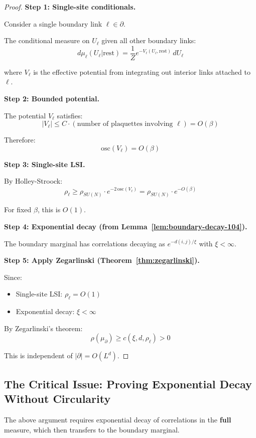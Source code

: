 \begin{proof}
\textbf{Step 1: Single-site conditionals.}

Consider a single boundary link $\ell \in \partial$.

The conditional measure on $U_\ell$ given all other boundary links:
\[
d\mu_\ell(U_\ell | \text{rest}) = \frac{1}{Z} e^{-V_\ell(U_\ell, \text{rest})} \, dU_\ell
\]

where $V_\ell$ is the effective potential from integrating out interior links 
attached to $\ell$.

\textbf{Step 2: Bounded potential.}

The potential $V_\ell$ satisfies:
\[
|V_\ell| \leq C \cdot (\text{number of plaquettes involving } \ell) = O(\beta)
\]

Therefore:
\[
\mathrm{osc}(V_\ell) = O(\beta)
\]

\textbf{Step 3: Single-site LSI.}

By Holley-Stroock:
\[
\rho_\ell \geq \rho_{SU(N)} \cdot e^{-2\,\mathrm{osc}(V_\ell)} = \rho_{SU(N)} \cdot e^{-O(\beta)}
\]

For fixed $\beta$, this is $O(1)$.

\textbf{Step 4: Exponential decay (from Lemma~\ref{lem:boundary-decay-104}).}

The boundary marginal has correlations decaying as $e^{-d(i,j)/\xi}$ with $\xi < \infty$.

\textbf{Step 5: Apply Zegarlinski (Theorem~\ref{thm:zegarlinski}).}

Since:
\begin{itemize}
\item Single-site LSI: $\rho_\ell = O(1)$
\item Exponential decay: $\xi < \infty$
\end{itemize}

By Zegarlinski's theorem:
\[
\rho(\mu_\partial) \geq c(\xi, d, \rho_\ell) > 0
\]

This is independent of $|\partial| = O(L^d)$.
\end{proof}

\subsection{The Critical Issue: Proving Exponential Decay Without Circularity}

The above argument requires exponential decay of correlations in the \textbf{full} 
measure, which then transfers to the boundary marginal.


